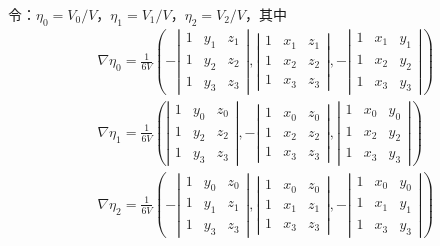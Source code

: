 \documentclass[a4paper, 12pt, UTF8]{ctexart}
\begin{document}
令：$\eta_{0} = V_{0}/V$，$\eta_{1} = V_{1}/V$，$\eta_{2} = V_{2}/V$，其中
\begin{equation}
\begin{split}
&\nabla \eta _{0}=\frac{1}{6 V}\left(-\left|\begin{array}{lll}
1 & y_{1} & z_{1} \\
1 & y_{2} & z_{2} \\
1 & y_{3} & z_{3}
\end{array}\right|, \left|\begin{array}{lll}
1 & x_{1} & z_{1} \\
1 & x_{2} & z_{2} \\
1 & x_{3} & z_{3}
\end{array}\right|, -\left|\begin{array}{ccc}
1 & x_{1} & y_{1} \\
1 & x_{2} & y_{2} \\
1 & x_{3} & y_{3}
\end{array}\right|\right) \\[2pt]
&\nabla \eta_{1}=\frac{1}{6 V}\left(\left|\begin{array}{lll}
1 & y_{0} & z_{0} \\
1 & y_{2} & z_{2} \\
1 & y_{3} & z_{3}
\end{array}\right|, -\left|\begin{array}{lll}
1 & x_{0} & z_{0} \\
1 & x_{2} & z_{2} \\
1 & x_{3} & z_{3}
\end{array}\right|, \left|\begin{array}{ccc}
1 & x_{0} & y_{0} \\
1 & x_{2} & y_{2} \\
1 & x_{3} & y_{3}
\end{array}\right|\right) \\[2pt]
&\nabla \eta_{2}=\frac{1}{6 V}\left(-\left|\begin{array}{lll}
1 & y_{0} & z_{0} \\
1 & y_{1} & z_{1} \\
1 & y_{3} & z_{3}
\end{array}\right|, \left|\begin{array}{lll}
1 & x_{0} & z_{0} \\
1 & x_{1} & z_{1} \\
1 & x_{3} & z_{3}
\end{array}\right|, -\left|\begin{array}{ccc}
1 & x_{0} & y_{0} \\
1 & x_{1} & y_{1} \\
1 & x_{3} & y_{3}
\end{array}\right|\right)
\end{split}
\end{equation}
\end{document}
